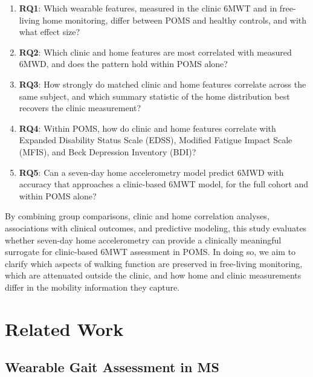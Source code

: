 \documentclass{article}
\begin{document}
\begin{enumerate}
    \item \textbf{RQ1}: Which wearable features, measured in the clinic 6MWT and in free-living home monitoring, differ between POMS and healthy controls, and with what effect size?
    \item \textbf{RQ2}: Which clinic and home features are most correlated with measured 6MWD, and does the pattern hold within POMS alone?
    \item \textbf{RQ3}: How strongly do matched clinic and home features correlate across the same subject, and which summary statistic of the home distribution best recovers the clinic measurement?
    \item \textbf{RQ4}: Within POMS, how do clinic and home features correlate with Expanded Disability Status Scale (EDSS), Modified Fatigue Impact Scale (MFIS), and Beck Depression Inventory (BDI)?
    \item \textbf{RQ5}: Can a seven-day home accelerometry model predict 6MWD with accuracy that approaches a clinic-based 6MWT model, for the full cohort and within POMS alone?
\end{enumerate}

By combining group comparisons, clinic and home correlation analyses, associations with clinical outcomes, and predictive modeling, this study evaluates whether seven-day home accelerometry can provide a clinically meaningful surrogate for clinic-based 6MWT assessment in POMS. In doing so, we aim to clarify which aspects of walking function are preserved in free-living monitoring, which are attenuated outside the clinic, and how home and clinic measurements differ in the mobility information they capture.


\section{Related Work}\label{sec:related}

\subsection{Wearable Gait Assessment in MS}
\end{document}
